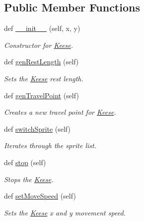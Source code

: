\subsection*{Public Member Functions}
\begin{DoxyCompactItemize}
\item 
def \hyperlink{classactor_1_1keese_1_1_keese_a5a6d46ac05ff7500ab07e0494ddbe3ce}{\+\_\+\+\_\+init\+\_\+\+\_\+} (self, x, y)
\begin{DoxyCompactList}\small\item\em Constructor for \hyperlink{classactor_1_1keese_1_1_keese}{Keese}. \end{DoxyCompactList}\item 
def \hyperlink{classactor_1_1keese_1_1_keese_ad69c85211ff8008fd3c223296dc16af7}{gen\+Rest\+Length} (self)
\begin{DoxyCompactList}\small\item\em Sets the \hyperlink{classactor_1_1keese_1_1_keese}{Keese} rest length. \end{DoxyCompactList}\item 
def \hyperlink{classactor_1_1keese_1_1_keese_a7abbd03624a6695b83d3086e48957d86}{gen\+Travel\+Point} (self)
\begin{DoxyCompactList}\small\item\em Creates a new travel point for \hyperlink{classactor_1_1keese_1_1_keese}{Keese}. \end{DoxyCompactList}\item 
def \hyperlink{classactor_1_1keese_1_1_keese_aee33f864229b0a7aa9a8b1d258ed696b}{switch\+Sprite} (self)
\begin{DoxyCompactList}\small\item\em Iterates through the sprite list. \end{DoxyCompactList}\item 
def \hyperlink{classactor_1_1keese_1_1_keese_a61477e66e28a62bb0a72a302b13c3ca0}{stop} (self)
\begin{DoxyCompactList}\small\item\em Stops the \hyperlink{classactor_1_1keese_1_1_keese}{Keese}. \end{DoxyCompactList}\item 
def \hyperlink{classactor_1_1keese_1_1_keese_a6fe0305b143de210b4b161a1091f7891}{set\+Move\+Speed} (self)
\begin{DoxyCompactList}\small\item\em Sets the \hyperlink{classactor_1_1keese_1_1_keese}{Keese} x and y movement speed. \end{DoxyCompactList}\item 

\end{DoxyCompactItemize}
